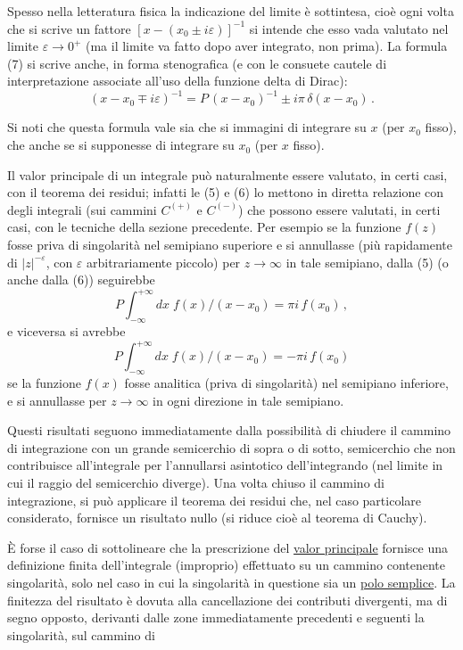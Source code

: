\documentclass[11pt, a4paper]{book}
\numberwithin{equation}{section}
\begin{document}
Spesso nella letteratura fisica la indicazione del limite è sottintesa, cioè ogni volta che si scrive un fattore $\left[x-(x_0 \pm i\varepsilon)\right]^{-1}$ si intende che esso vada valutato nel limite $\varepsilon \to 0^+$ (ma il limite va fatto dopo aver%
integrato, non prima). La formula (7) si scrive anche, in forma stenografica (e con le consuete cautele di interpretazione associate all'uso della funzione delta di Dirac):
\begin{equation}
(x - x_0 \mp i\varepsilon)^{-1} = P\,(x-x_0)^{-1} \pm i\pi\,\delta(x-x_0)\,. \tag{8}
\end{equation}

Si noti che questa formula vale sia che si immagini di integrare su $x$ (per $x_0$ fisso), che anche se si supponesse di integrare su $x_0$ (per $x$ fisso).

Il valor principale di un integrale può naturalmente essere valutato, in certi casi, con il teorema dei residui; infatti le (5) e (6) lo mettono in diretta relazione con degli integrali (sui cammini $C^{(+)}$ e $C^{(-)}$) che possono essere valutati, in certi casi, con le tecniche della sezione precedente. Per esempio se la funzione $f(z)$ fosse priva di singolarità nel semipiano superiore e si annullasse (più rapidamente di $|z|^{-\varepsilon}$, con $\varepsilon$ arbitrariamente piccolo) per $z \to \infty$ in tale semipiano, dalla (5) (o anche dalla (6)) seguirebbe
\begin{equation}
P\!\int_{-\infty}^{+\infty} dx\; f(x)/(x-x_0) = \pi i\, f(x_0)\,, \tag{9}
\end{equation}
e viceversa si avrebbe
\begin{equation}
P\!\int_{-\infty}^{+\infty} dx\; f(x)/(x-x_0) = -\pi i\, f(x_0) \tag{10}
\end{equation}
se la funzione $f(x)$ fosse analitica (priva di singolarità) nel semipiano inferiore, e si annullasse per $z \to \infty$ in ogni direzione in tale semipiano.

Questi risultati seguono immediatamente dalla possibilità di chiudere il cammino di integrazione con un grande semicerchio di sopra o di sotto, semicerchio che non contribuisce all'integrale per l'annullarsi asintotico dell'integrando (nel limite in cui il raggio del semicerchio diverge). Una volta chiuso il cammino di integrazione, si può applicare il teorema dei residui che, nel caso particolare considerato, fornisce un risultato nullo (si riduce cioè al teorema di Cauchy).

È forse il caso di sottolineare che la prescrizione del \underline{valor principale} fornisce una definizione finita dell'integrale (improprio) effettuato su un cammino contenente singolarità, solo nel caso in cui la singolarità in questione sia un \underline{polo semplice}. La finitezza del risultato è dovuta alla cancellazione dei contributi divergenti, ma di segno opposto, derivanti dalle zone immediatamente precedenti e seguenti la singolarità, sul cammino di%
\end{document}
